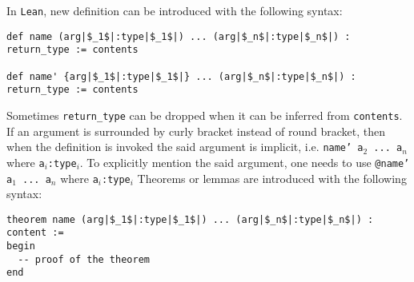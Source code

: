 \documentclass{report}
\theoremstyle{definition}
\theoremstyle{plain}
\begin{document}
In {\tt Lean}, new definition can be introduced with the following syntax:
\begin{verbatim}
def name (arg|$_1$|:type|$_1$|) ... (arg|$_n$|:type|$_n$|) : return_type := contents

def name' {arg|$_1$|:type|$_1$|} ... (arg|$_n$|:type|$_n$|) : return_type := contents
\end{verbatim}
Sometimes {\tt return\_type} can be dropped when it can be inferred from {\tt contents}. If an argument is surrounded by curly bracket instead of round bracket, then when the definition is invoked the said argument is implicit, i.e. {\tt name' a$_2$ ... a$_n$} where {\tt a$_i$:type$_i$}. To explicitly mention the said argument, one needs to use {\tt @name' a$_1$ ... a$_n$} where {\tt a$_i$:type$_i$}
Theorems or lemmas are introduced with the following syntax:

\begin{verbatim}
theorem name (arg|$_1$|:type|$_1$|) ... (arg|$_n$|:type|$_n$|) : content :=
begin
  -- proof of the theorem
end
\end{verbatim}
\end{document}

